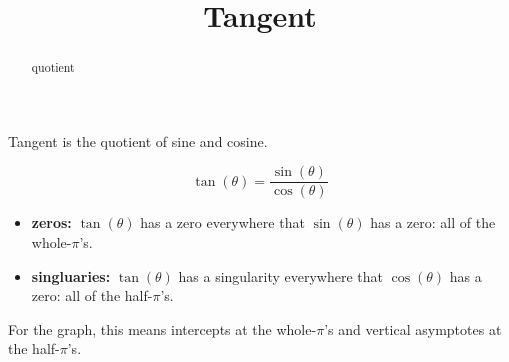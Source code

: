 \documentclass{ximera}
\title{Tangent}
\begin{document}
\begin{abstract}
quotient
\end{abstract}
\maketitle







Tangent is the quotient of sine and cosine.

\[   \tan(\theta)  =  \frac{\sin(\theta)}{\cos(\theta)}  \]


\begin{itemize}
\item \textbf{zeros:} $\tan(\theta)$ has a zero everywhere that $\sin(\theta)$ has a zero:  all of the whole-$\pi$'s.
\item \textbf{singluaries:} $\tan(\theta)$ has a singularity everywhere that $\cos(\theta)$ has a zero:  all of the half-$\pi$'s.
\end{itemize}

For the graph, this means intercepts at the whole-$\pi$'s and vertical asymptotes at the half-$\pi$'s.
\end{document}
